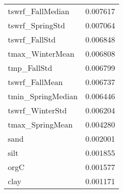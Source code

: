 \begin{tabular}{lr}
tswrf_FallMedian & 0.007617 \\
tswrf_SpringStd & 0.007064 \\
tswrf_FallStd & 0.006848 \\
tmax_WinterMean & 0.006808 \\
tmp_FallStd & 0.006799 \\
tswrf_FallMean & 0.006737 \\
tmin_SpringMedian & 0.006446 \\
tswrf_WinterStd & 0.006204 \\
tmax_SpringMean & 0.004280 \\
sand & 0.002001 \\
silt & 0.001855 \\
orgC & 0.001577 \\
clay & 0.001171 \\
\bottomrule
\end{tabular}
